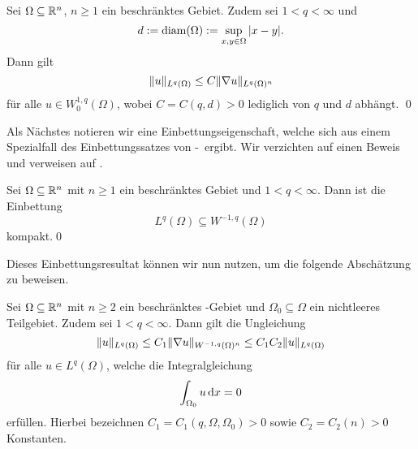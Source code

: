 \begin{lem}
  \label{lem:poincare}
  Sei $\Omega \subseteq \mathbb{R}^n$, $n \geq 1$ ein beschränktes Gebiet.
  Zudem sei $1 < q < \infty$ und 
  $$
  d := \operatorname{diam}(\Omega) := \sup_{x, y \in \Omega} | x - y |.
  $$
  Dann gilt
  $$
  \lVert u \rVert_{L^q(\Omega)} \leq C \lVert \nabla u \rVert_{L^q(\Omega)^n}
  $$
  für alle $u \in W_0^{1,q}(\Omega)$, wobei $C = C(q,d) > 0$ lediglich von $q$ und $d$ abhängt. \qed
\end{lem}

Als Nächstes notieren wir eine Einbettungseigenschaft, welche sich aus einem Spezialfall des Einbettungssatzes von \rellich\hyp{}\kondrachov\ ergibt. 
Wir verzichten auf einen Beweis und verweisen auf \cite[S.168, Theorem 6.3]{adams2003sobolev}.

\begin{lem}
  \label{lem:compactEmbedding0}
  Sei $\Omega \subseteq \mathbb{R}^n$ mit $n \geq 1$ ein beschränktes Gebiet und $1 < q < \infty$.
  Dann ist die Einbettung
  $$
  L^q(\Omega) \subseteq W^{-1,q}(\Omega)
  $$
  kompakt.\qed
\end{lem}

Dieses Einbettungsresultat können wir nun nutzen, um die folgende Abschätzung zu beweisen.

\begin{lem}
  \label{lem:compactEmbedding}
  Sei $\Omega \subseteq \mathbb{R}^n$ mit $n \geq 2$ ein beschränktes \lipschitz\hyp{}Gebiet und $\Omega_0 \subseteq \Omega$ ein nichtleeres Teilgebiet.
  Zudem sei $1 < q < \infty$.
  Dann gilt die Ungleichung
  \begin{equation}
    \label{eq:compactInequality}
    \lVert u \rVert_{L^q(\Omega)} 
    \leq C_1 \lVert \nabla u \rVert_{W^{-1,q}(\Omega)^n}
    \leq C_1 C_2 \lVert u \rVert_{L^q(\Omega)}
  \end{equation}
  für alle $u \in L^q(\Omega)$, welche die Integralgleichung
  $$
  \int_{\Omega_0} u \, {\operatorname{d}\!{x}} = 0
  $$
  erfüllen.
  Hierbei bezeichnen $C_1 = C_1(q, \Omega, \Omega_0) > 0$ sowie $C_2 = C_2(n) > 0$ Konstanten.
\end{lem}

